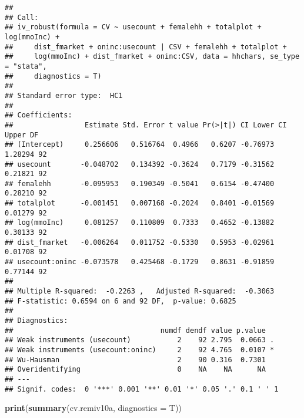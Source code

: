 \documentclass[
]{article}
\newenvironment{Shaded}{\begin{snugshade}}{\end{snugshade}}
\newcommand{\DataTypeTok}[1]{\textcolor[rgb]{0.13,0.29,0.53}{#1}}
\newcommand{\KeywordTok}[1]{\textcolor[rgb]{0.13,0.29,0.53}{\textbf{#1}}}
\newcommand{\NormalTok}[1]{#1}
\begin{document}
\begin{verbatim}
## 
## Call:
## iv_robust(formula = CV ~ usecount + femalehh + totalplot + log(mmoInc) + 
##     dist_fmarket + oninc:usecount | CSV + femalehh + totalplot + 
##     log(mmoInc) + dist_fmarket + oninc:CSV, data = hhchars, se_type = "stata", 
##     diagnostics = T)
## 
## Standard error type:  HC1 
## 
## Coefficients:
##                 Estimate Std. Error t value Pr(>|t|) CI Lower CI Upper DF
## (Intercept)     0.256606   0.516764  0.4966   0.6207 -0.76973  1.28294 92
## usecount       -0.048702   0.134392 -0.3624   0.7179 -0.31562  0.21821 92
## femalehh       -0.095953   0.190349 -0.5041   0.6154 -0.47400  0.28210 92
## totalplot      -0.001451   0.007168 -0.2024   0.8401 -0.01569  0.01279 92
## log(mmoInc)     0.081257   0.110809  0.7333   0.4652 -0.13882  0.30133 92
## dist_fmarket   -0.006264   0.011752 -0.5330   0.5953 -0.02961  0.01708 92
## usecount:oninc -0.073578   0.425468 -0.1729   0.8631 -0.91859  0.77144 92
## 
## Multiple R-squared:  -0.2263 ,   Adjusted R-squared:  -0.3063 
## F-statistic: 0.6594 on 6 and 92 DF,  p-value: 0.6825
## 
## Diagnostics:
##                                   numdf dendf value p.value  
## Weak instruments (usecount)           2    92 2.795  0.0663 .
## Weak instruments (usecount:oninc)     2    92 4.765  0.0107 *
## Wu-Hausman                            2    90 0.316  0.7301  
## Overidentifying                       0    NA    NA      NA  
## ---
## Signif. codes:  0 '***' 0.001 '**' 0.01 '*' 0.05 '.' 0.1 ' ' 1
\end{verbatim}

\pagebreak

\begin{Shaded}
\begin{Highlighting}[]
\KeywordTok{print}\NormalTok{(}\KeywordTok{summary}\NormalTok{(cv.remiv10a, }\DataTypeTok{diagnostics =}\NormalTok{ T))}
\end{Highlighting}
\end{Shaded}
\end{document}

